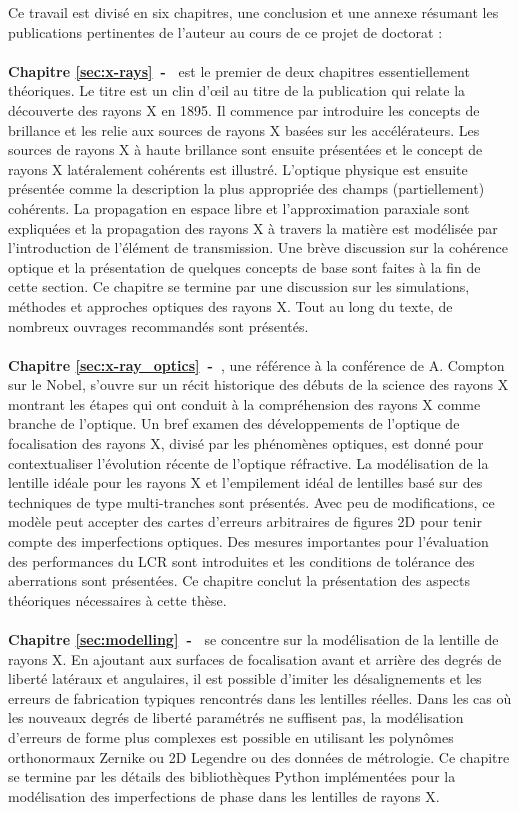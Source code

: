 Ce travail est divisé en six chapitres, une conclusion et une annexe résumant les publications pertinentes de l'auteur au cours de ce projet de doctorat :
\\
\\
\textbf{Chapitre \ref{sec:x-rays}~-~} est le premier de deux chapitres essentiellement théoriques. Le titre est un clin d'œil au titre de la publication qui relate la découverte des rayons X en 1895. Il commence par introduire les concepts de brillance et les relie aux sources de rayons X basées sur les accélérateurs. Les sources de rayons X à haute brillance sont ensuite présentées et le concept de rayons X latéralement cohérents est illustré. L'optique physique est ensuite présentée comme la description la plus appropriée des champs (partiellement) cohérents. La propagation en espace libre et l'approximation paraxiale sont expliquées et la propagation des rayons X à travers la matière est modélisée par l'introduction de l'élément de transmission. Une brève discussion sur la cohérence optique et la présentation de quelques concepts de base sont faites à la fin de cette section. Ce chapitre se termine par une discussion sur les simulations, méthodes et approches optiques des rayons X. Tout au long du texte, de nombreux ouvrages recommandés sont présentés.
\\
\\
\textbf{Chapitre \ref{sec:x-ray_optics}~-~}, une référence à la conférence de A. Compton sur le Nobel, s'ouvre sur un récit historique des débuts de la science des rayons X montrant les étapes qui ont conduit à la compréhension des rayons X comme branche de l'optique. Un bref examen des développements de l'optique de focalisation des rayons X, divisé par les phénomènes optiques, est donné pour contextualiser l'évolution récente de l'optique réfractive. La modélisation de la lentille idéale pour les rayons X et l'empilement idéal de lentilles basé sur des techniques de type multi-tranches sont présentés. Avec peu de modifications, ce modèle peut accepter des cartes d'erreurs arbitraires de figures 2D pour tenir compte des imperfections optiques. Des mesures importantes pour l'évaluation des performances du LCR sont introduites et les conditions de tolérance des aberrations sont présentées. Ce chapitre conclut la présentation des aspects théoriques nécessaires à cette thèse.
\\
\\
\textbf{Chapitre \ref{sec:modelling}~-~} se concentre sur la modélisation de la lentille de rayons X. En ajoutant aux surfaces de focalisation avant et arrière des degrés de liberté latéraux et angulaires, il est possible d'imiter les désalignements et les erreurs de fabrication typiques rencontrés dans les lentilles réelles. Dans les cas où les nouveaux degrés de liberté paramétrés ne suffisent pas, la modélisation d'erreurs de forme plus complexes est possible en utilisant les polynômes orthonormaux Zernike ou 2D Legendre ou des données de métrologie. Ce chapitre se termine par les détails des bibliothèques Python implémentées pour la modélisation des imperfections de phase dans les lentilles de rayons X.

